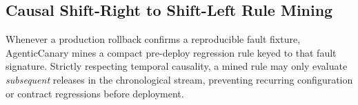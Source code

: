 \subsection{Causal Shift-Right to Shift-Left Rule Mining}
Whenever a production rollback confirms a reproducible fault fixture, AgenticCanary mines a compact pre-deploy regression rule keyed to that fault signature. Strictly respecting temporal causality, a mined rule may only evaluate \emph{subsequent} releases in the chronological stream, preventing recurring configuration or contract regressions before deployment.
